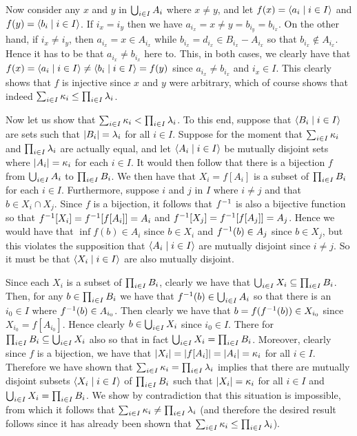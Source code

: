 \begin{questions}
{{      Now consider any $x$ and $y$ in $\bigcup_{i \in I} A_i$ where $x \neq y$, and let $f(x) = \left\langle a_i \mid i \in I \right\rangle$ and $f(y) = \left\langle b_i \mid i \in I \right\rangle$.
      If $i_x = i_y$ then we have $a_{i_x} = x \neq y = b_{i_y} = b_{i_x}$.
      On the other hand, if $i_x \neq i_y$, then $a_{i_x} = x \in A_{i_x}$ while $b_{i_x} = d_{i_x} \in B_{i_x} - A_{i_x}$ so that $b_{i_x} \notin A_{i_x}$.
      Hence it has to be that $a_{i_x} \neq b_{i_x}$ here to.
      This, in both cases, we clearly have that $f(x) = \left\langle a_i \mid i \in I \right\rangle \neq \left\langle b_i \mid i \in I \right\rangle = f(y)$ since $a_{i_x} \neq b_{i_x}$ and $i_x \in I$.
      This clearly shows that $f$ is injective since $x$ and $y$ were arbitrary, which of course shows that indeed $\sum_{i \in I} \kappa_i \leq \prod_{i \in I} \lambda_i$.

      Now let us show that $\sum_{i \in I} \kappa_i < \prod_{i \in I} \lambda_i$.
      To this end, suppose that $\left\langle B_i \mid i \in I \right\rangle$ are sets such that $\left| B_i \right| = \lambda_i$ for all $i \in I$.
      Suppose for the moment that $\sum_{i \in I} \kappa_i$ and $\prod_{i \in I} \lambda_i$ are actually equal, and let $\left\langle A_i \mid i \in I \right\rangle$ be mutually disjoint sets where $\left| A_i \right| = \kappa_i$ for each $i \in I$.
      It would then follow that there is a bijection $f$ from $\bigcup_{i \in I} A_i$ to $\prod_{i \in I} B_i$.
      We then have that $X_i = f[A_i]$ is a subset of $\prod_{i \in I} B_i$ for each $i \in I$.
      Furthermore, suppose $i$ and $j$ in $I$ where $i \neq j$ and that $b \in X_i \cap X_j$.
      Since $f$ is a bijection, it follows that $f^{-1}$ is also a bijective function so that $f^{-1}[X_i] = f^{-1}[f[A_i]] = A_i$ and $f^{-1}[X_j] = f^{-1}[f[A_j]] = A_j$.
      Hence we would have that $\inf{f}(b) \in A_i$ since $b \in X_i$ and $f^{-1}(b) \in A_j$ since $b \in X_j$, but this violates the supposition that $\left\langle A_i \mid i \in I \right\rangle$ are mutually disjoint since $i \neq j$.
      So it must be that $\left\langle X_i \mid i \in I \right\rangle$ are also mutually disjoint.

      Since each $X_i$ is a subset of $\prod_{i \in I} B_i$, clearly we have that $\bigcup_{i \in I} X_i \subseteq \prod_{i \in I} B_i$.
      Then, for any $b \in \prod_{i \in I} B_i$ we have that $f^{-1}(b) \in \bigcup_{i \in I} A_i$ so that there is an $i_0 \in I$ where $f^{-1}(b) \in A_{i_0}$.
      Then clearly we have that $b = f(f^{-1}(b)) \in X_{i_0}$ since $X_{i_0} = f[A_{i_0}]$.
      Hence clearly $b \in \bigcup_{i \in I} X_i$ since $i_0 \in I$.
      There for $\prod_{i \in I} B_i \subseteq \bigcup_{i \in I} X_i$ also so that in fact $\bigcup_{i \in I} X_i = \prod_{i \in I} B_i$.
      Moreover, clearly since $f$ is a bijection, we have that $\left| X_i \right| = \left| f[A_i] \right| = \left| A_i \right| = \kappa_i$ for all $i \in I$.
      Therefore we have shown that $\sum_{i \in I} \kappa_i = \prod_{i \in I} \lambda_i$ implies that there are mutually disjoint subsets $\left\langle X_i \mid i \in I \right\rangle$ of $\prod_{i \in I} B_i$ such that $\left| X_i \right| = \kappa_i$ for all $i \in I$ and $\bigcup_{i \in I} X_i = \prod_{i \in I} B_i$.
      We show by contradiction that this situation is impossible, from which it follows that $\sum_{i \in I} \kappa_i \neq \prod_{i \in I} \lambda_i$ (and therefore the desired result follows since it has already been shown that $\sum_{i \in I} \kappa_i \leq \prod_{i \in I} \lambda_i$).

}}
\end{questions}
